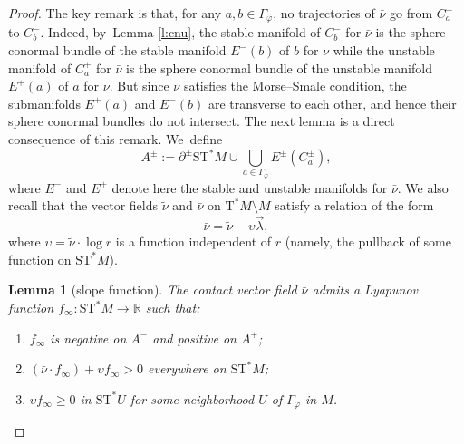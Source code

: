 \documentclass[JEP,XML,SOM,Unicode]{cedram}
\newenvironment{enumeratei}
{\bgroup\def\theenumi{\roman{enumi}}\def\theenumii{\arabic{enumii}}\begin{enumerate}}
{\end{enumerate}\egroup}
\newcommand{\R}{{\mathbb R}}
\newcommand{\Crit}{\Gamma_{\!\varphi}}
\newcommand{\tu}[1]{\textup{#1}}
\newcommand{\sT}{\mathrm{T}^\ast}
\newcommand{\sST}{\mathrm{ST}^\ast}
\newcommand{\hnu}{\tilde\nu}
\newcommand{\cnu}{\bar\nu}
\newcommand{\de}{\mathrel{:=}}
\let\del\partial
\let\on\colon
\let\ups\upsilon
\theoremstyle{plain}
\newtheorem{lemma}[theorem]{Lemma}
\theoremstyle{definition}
\begin{document}
\begin{proof}
The key remark is that, for any $a, b \in \Crit$, no trajectories of $\cnu$ go
from $C_a^+$ to $C_b^-$. Indeed, by~Lemma \ref{l:cnu}, the stable manifold of
$C_b^-$ for $\cnu$ is the sphere conormal bundle of the stable manifold $E^-(b)$
of $b$ for $\nu$ while the unstable manifold of $C_a^+$ for $\cnu$ is the sphere
conormal bundle of the unstable manifold $E^+(a)$ of $a$ for $\nu$. But since
$\nu$ satisfies the Morse--Smale condition, the submanifolds $E^+(a)$ and $E^-
(b)$ are transverse to each other, and hence their sphere conormal bundles do
not intersect. The next lemma is a direct consequence of this remark. We~define
\[
A^\pm \de \del^\pm \sST M \cup \bigcup_{a \in \Crit} E^\pm(C_a^\pm),
\]
where $E^-$ and $E^+$ denote here the stable and unstable manifolds for $\cnu$.
We also recall that the vector fields $\hnu$ and $\cnu$ on $\sT M \setminus M$ satisfy a
relation of the form
\[
\cnu = \hnu - \ups \vec\lambda,
\]
where $\ups = \hnu \cdot \log r$ is a function independent of $r$ (namely, the
pullback of some function on $\sST M$).

\begin{lemma}[slope function] \label{l:slope}
The contact vector field $\cnu$ admits a Lyapunov function $f_\infty \on \sST
M \to \R$ such that\tu:
\begin{enumeratei}
\item\label{l:slopei}
$f_\infty$ is negative on $A^-$ and positive on $A^+$\tu;
\item\label{l:slopeii}
$(\cnu \cdot f_\infty) + \ups f_\infty > 0$ everywhere on $\sST M$\tu;
\item\label{l:slopeiii}
$\ups f_\infty \ge 0$ in $\sST U$ for some neighborhood $U$ of $\Crit$ in $M$.
\end{enumeratei}
\end{lemma}


\end{proof}
\end{document}
